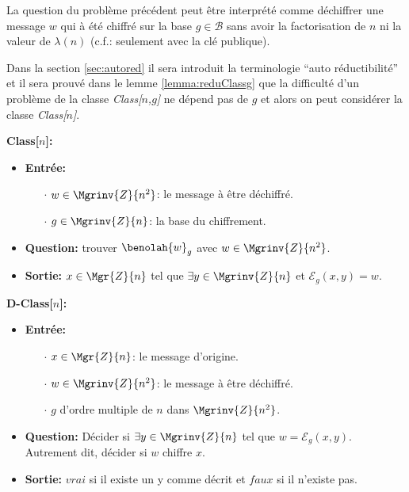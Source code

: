 La question du problème précédent peut être interprété comme déchif\-frer une message $w$ qui à été chiffré sur la base $g\in\mathcal{B}$ sans
avoir la factorisation de $n$ ni la valeur de $\lambda(n)$ (c.f.: seulement avec la clé publique).

\begin{remark}
	Dans la section \ref{sec:autored} il sera introduit la terminologie ``auto ré\-ducti\-bi\-lité'' et il sera prouvé
	dans le lemme \ref{lemma:reduClassg}
	que la difficulté d'un problème de la classe \textit{Class[$n$,$g$]} ne dépend pas de $g$ et alors on peut considérer la classe 
	\textit{Class[$n$]}. 
\end{remark}

\begin{problem} \textbf{Class[$n$]:} %
	\begin{rm}
		\begin{itemize}	
		\renewcommand{\labelitemi}{}
		\item\textbf{Entrée:} 
			\begin{itemize}
				\item[$\cdot$] $w\in\Mgrinv{Z}{n^2}$: le message à être déchiffré.
				\item[$\cdot$] $g\in\Mgrinv{Z}{n}$: la base du chiffrement.
			\end{itemize}
		\item\textbf{Question:} trouver $\benolah{w}_g$ avec $w \in \Mgrinv{Z}{n^2}$.
		\item\textbf{Sortie:}
			$x \in \Mgr{Z}{n}$ tel que $\exists y \in \Mgrinv{Z}{n}$ et $\mathcal{E}_g(x,y) = w$.
		\end{itemize}
	\end{rm}
\end{problem}

\begin{problem} \textbf{D-Class[$n$]:}%
	\begin{rm}
		\begin{itemize}	
		\renewcommand{\labelitemi}{}
		\item\textbf{Entrée:} 
			\begin{itemize}
				\item[$\cdot$] $x\in\Mgr{Z}{n}$: le message d'origine.
				\item[$\cdot$] $w\in\Mgrinv{Z}{n^2}$: le message à être déchiffré.
				\item[$\cdot$] $g$ d'ordre  multiple de $n$ dans $\Mgrinv{Z}{n^2}$.
			\end{itemize}
		\item\textbf{Question:} Décider si $\exists y \in \Mgrinv{Z}{n}$ tel que $w = \mathcal{E}_g(x,y)$. Autrement dit, décider si $w$ chiffre $x$.
		\item\textbf{Sortie:}
			$vrai$ si il existe un y comme décrit et $faux$ si il n'existe pas.
		\end{itemize}
	\end{rm}
\end{problem}

